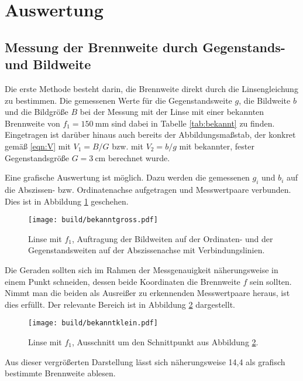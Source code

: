 \section{Auswertung}
\label{sec:Auswertung}

\subsection{Messung der Brennweite durch Gegenstands- und Bildweite}
Die erste Methode besteht darin, die Brennweite direkt durch die Linsengleichung
zu bestimmen. Die gemessenen Werte für die Gegenstandsweite $g$, die Bildweite
$b$ und die Bildgröße $B$  bei der Messung mit der Linse mit einer bekannten
Brennweite von $f_1 = \SI{150}{\milli\meter}$ sind dabei in Tabelle
\ref{tab:bekannt} zu finden. Eingetragen ist darüber hinaus auch bereits der
Abbildungsmaßstab, der konkret gemäß \eqref{eqn:V} mit $V_1=B/G$ bzw. mit $V_2=b/g$
mit bekannter, fester Gegenstandsgröße $G = \SI{3}{\centi\meter}$ berechnet wurde.


Eine grafische Auswertung ist möglich. Dazu werden die gemessenen $g_i$ und
$b_i$ auf die Abszissen- bzw. Ordinatenachse aufgetragen und Messwertpaare verbunden.
Dies ist in Abbildung \ref{fig:bekanntgross} geschehen.

\begin{figure}
  \centering
  \texttt{[image: build/bekanntgross.pdf]}
  \caption{Linse mit $f_1$, Auftragung der Bildweiten auf der Ordinaten- und der Gegenstandsweiten auf der Abszissenachse mit Verbindungslinien.}
  \label{fig:bekanntgross}
\end{figure}

Die Geraden sollten sich im Rahmen der Messgenauigkeit näherungsweise in einem Punkt
schneiden, dessen beide Koordinaten die Brennweite $f$ sein sollten. Nimmt man die
beiden als Ausreißer zu erkennenden Messwertpaare heraus, ist dies
erfüllt. Der relevante Bereich ist in Abbildung \ref{fig:bekanntklein} dargestellt.

\begin{figure}
  \centering
  \texttt{[image: build/bekanntklein.pdf]}
  \caption{Linse mit $f_1$, Ausschnitt um den Schnittpunkt aus Abbildung \ref{fig:bekanntklein}.}
  \label{fig:bekanntklein}
\end{figure}

Aus dieser vergrößerten Darstellung lässt sich näherungsweise 14,4 als grafisch
bestimmte Brennweite ablesen.

